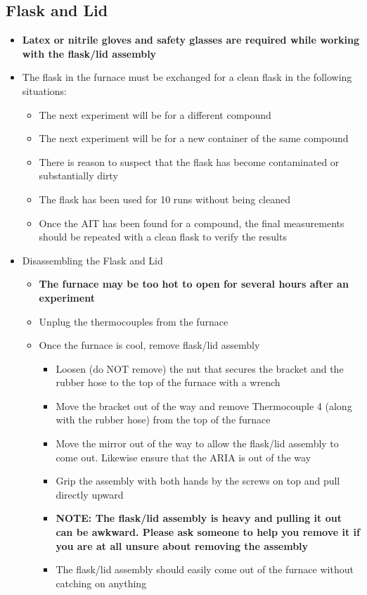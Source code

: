 \documentclass[letterpaper,11pt]{article}
\begin{document}
    \subsection{Flask and Lid}
    \begin{itemize}
    \item \textbf{Latex or nitrile gloves and safety glasses are 
            required while working with the flask/lid assembly}
    \item The flask in the furnace must be exchanged for a clean flask in the 
        following situations:
        \begin{itemize}
        \item The next experiment will be for a different compound
        \item The next experiment will be for a new container of the same 
            compound
        \item There is reason to suspect that the flask has become 
            contaminated or substantially dirty
        \item The flask has been used for 10 runs without being cleaned
        \item Once the AIT has been found for a compound, the final measurements
            should be repeated with a clean flask to verify the results
        \end{itemize}
    
    \item Disassembling the Flask and Lid
        \begin{itemize}
        \item \textbf{The furnace may be too hot to open for several hours after
             an experiment}
        \item Unplug the thermocouples from the furnace
        \item Once the furnace is cool, remove flask/lid assembly
            \begin{itemize}
            \item Loosen (do NOT remove) the nut that secures the bracket and 
                the rubber hose to the top of the furnace with a wrench
            \item Move the bracket out of the way and remove Thermocouple 4 
                (along with the rubber hose) from the top of the furnace
            \item Move the mirror out of the way to allow the flask/lid assembly
                to come out. Likewise ensure that the ARIA is out of the way
            \item Grip the assembly with both hands by the screws on top and 
                pull directly upward
            \item \textbf{NOTE: The flask/lid assembly is heavy and pulling it  
                out can be awkward. Please ask someone to help you remove it 
                if you are at all unsure about removing the assembly}
            \item The flask/lid assembly should easily come out of the furnace 
                without catching on anything
            \end{itemize}
        

\end{itemize}
\end{itemize}
\end{document}
